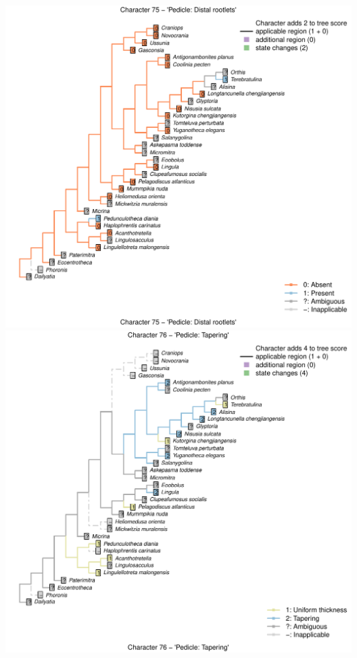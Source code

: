 \documentclass[]{book}
\theoremstyle{definition}
\theoremstyle{definition}
\theoremstyle{definition}
\theoremstyle{remark}
\begin{document}
\includegraphics{Brachiopod_phylogeny_files/figure-latex/unnamed-chunk-4-75.pdf}
\includegraphics{Brachiopod_phylogeny_files/figure-latex/unnamed-chunk-4-76.pdf}
\end{document}
